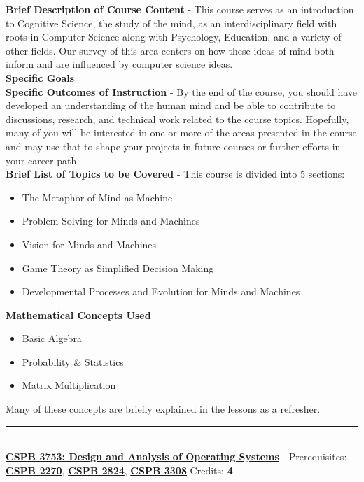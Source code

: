 \documentclass{article}
\newcommand{\horizontalline}{\noindent \rule{\textwidth}{0.5pt} \\}
\begin{document}
\noindent \textbf{Brief Description of Course Content} - This course serves as an introduction to Cognitive Science, the study of the mind, as an interdisciplinary field with roots in Computer Science along with Psychology, Education, and a variety of other fields. Our survey of this area centers on how these ideas of mind both inform and are influenced by computer science ideas. \\

\noindent \textbf{Specific Goals} \\

\noindent \textbf{Specific Outcomes of Instruction} - By the end of the course, you should have developed an understanding of the human mind and be able to contribute to discussions, research, and technical work related to the course topics. Hopefully, many of you will be interested in one or more of the areas presented in the course and may use that to shape your projects in future courses or further efforts in your career path. \\

\noindent \textbf{Brief List of Topics to be Covered} - This course is divided into 5 sections:
\begin{itemize}
    \item The Metaphor of Mind as Machine
    \item Problem Solving for Minds and Machines
    \item Vision for Minds and Machines
    \item Game Theory as Simplified Decision Making
    \item Developmental Processes and Evolution for Minds and Machines
\end{itemize}

\noindent \textbf{Mathematical Concepts Used}
\begin{itemize}
    \item Basic Algebra
    \item Probability \& Statistics
    \item Matrix Multiplication
\end{itemize}
Many of these concepts are briefly explained in the lessons as a refresher. \\
\horizontalline
\noindent \href{https://www.colorado.edu/program/cspb/cspb-3753-design-and-analysis-operating-systems}{\textbf{CSPB 3753: Design and Analysis of Operating Systems}} - Prerequisites: \href{https://www.colorado.edu/program/cspb/cspb-2270-computer-science-2-data-structures}{\textbf{CSPB 2270}}, \href{https://www.colorado.edu/program/cspb/cspb-2824-discrete-structures}{\textbf{CSPB 2824}}, \href{https://www.colorado.edu/program/cspb/cspb-3308-software-development-methods-and-tools}{\textbf{CSPB 3308}} Credits: \textbf{4} \\
\end{document}

